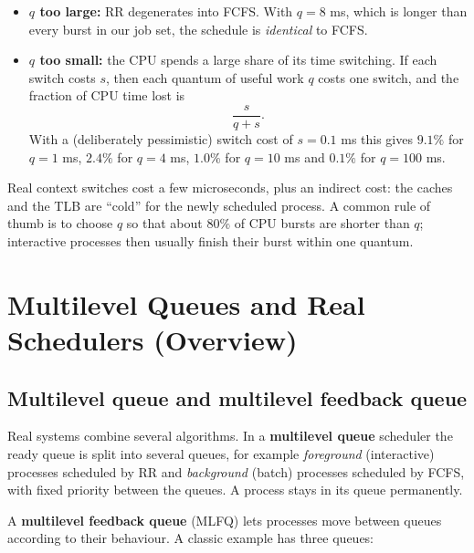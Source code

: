 \documentclass[11pt,a4paper]{article}
\newcommand{\term}[1]{\textbf{\color{mintdeep}#1}}
\begin{document}
\begin{itemize}
  \item \textbf{$q$ too large:} RR degenerates into FCFS. With $q = 8$ ms, which is longer than every burst in our job set, the schedule is \emph{identical} to FCFS.
  \item \textbf{$q$ too small:} the CPU spends a large share of its time switching. If each switch costs $s$, then each quantum of useful work $q$ costs one switch, and the fraction of CPU time lost is
\[
\frac{s}{q+s}.
\]
With a (deliberately pessimistic) switch cost of $s=0.1$ ms this gives $9.1\%$ for $q=1$ ms, $2.4\%$ for $q=4$ ms, $1.0\%$ for $q=10$ ms and $0.1\%$ for $q=100$ ms.
\end{itemize}

Real context switches cost a few microseconds, plus an indirect cost: the caches and the TLB are ``cold'' for the newly scheduled process. A common rule of thumb is to choose $q$ so that about $80\%$ of CPU bursts are shorter than $q$; interactive processes then usually finish their burst within one quantum.

\section{Multilevel Queues and Real Schedulers (Overview)}

\subsection{Multilevel queue and multilevel feedback queue}

Real systems combine several algorithms. In a \term{multilevel queue} scheduler the ready queue is split into several queues, for example \emph{foreground} (interactive) processes scheduled by RR and \emph{background} (batch) processes scheduled by FCFS, with fixed priority between the queues. A process stays in its queue permanently.

A \term{multilevel feedback queue} (MLFQ) lets processes move between queues according to their behaviour. A classic example has three queues:
\end{document}
